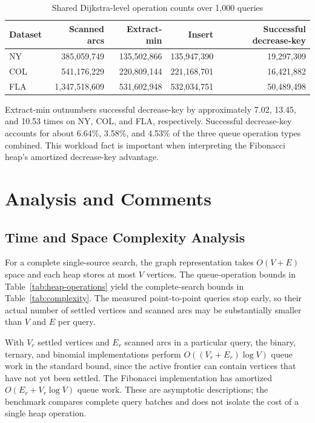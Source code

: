 \documentclass[12pt,a4paper]{report}
\begin{document}
\begin{table}[H]
  \centering
  \caption{Shared Dijkstra-level operation counts over 1,000 queries}
  \label{tab:work}
  \small
  \begin{tabular}{lrrrr}
    \toprule
    Dataset & Scanned arcs & Extract-min & Insert & Successful decrease-key \\
    \midrule
    NY  & 385,059,749 & 135,502,866 & 135,947,390 & 19,297,309 \\
    COL & 541,176,229 & 220,809,144 & 221,168,701 & 16,421,882 \\
    FLA & 1,347,518,609 & 531,602,948 & 532,034,751 & 50,489,498 \\
    \bottomrule
  \end{tabular}
\end{table}

Extract-min outnumbers successful decrease-key by approximately 7.02, 13.45,
and 10.53 times on NY, COL, and FLA, respectively. Successful decrease-key
accounts for about 6.64\%, 3.58\%, and 4.53\% of the three queue operation
types combined. This workload fact is important when interpreting the
Fibonacci heap's amortized decrease-key advantage.

\chapter{Analysis and Comments}

\section{Time and Space Complexity Analysis}
For a complete single-source search, the graph representation takes
$O(V+E)$ space and each heap stores at most $V$ vertices. The queue-operation
bounds in Table~\ref{tab:heap-operations} yield the complete-search bounds in
Table~\ref{tab:complexity}. The measured point-to-point queries stop early, so
their actual number of settled vertices and scanned arcs may be substantially
smaller than $V$ and $E$ per query.

With $V_r$ settled vertices and $E_r$ scanned arcs in a particular query, the
binary, ternary, and binomial implementations perform
$O((V_r+E_r)\log V)$ queue work in the standard bound, since the active
frontier can contain vertices that have not yet been settled. The Fibonacci
implementation has amortized $O(E_r+V_r\log V)$ queue work. These are
asymptotic descriptions; the benchmark compares complete query batches and
does not isolate the cost of a single heap operation.
\end{document}
